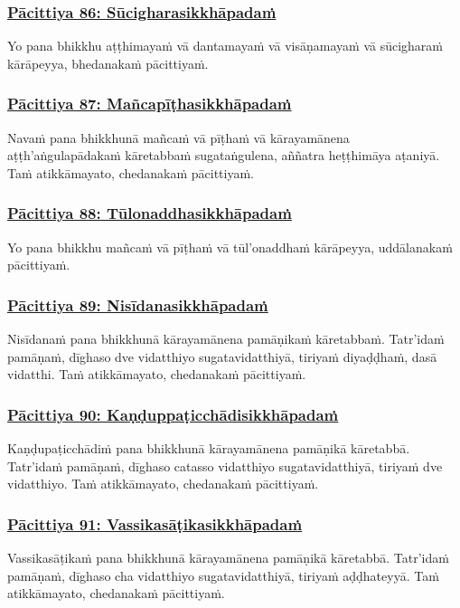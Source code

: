 \subsubsection*{\hyperref[exp86]{Pācittiya 86: Sūcigharasikkhāpadaṁ}}
\label{pac86}
Yo pana bhikkhu aṭṭhimayaṁ vā dantamayaṁ vā visāṇamayaṁ vā sūcigharaṁ kārāpeyya, bhedanakaṁ pācittiyaṁ.

\subsubsection*{\hyperref[exp87]{Pācittiya 87: Mañcapīṭhasikkhāpadaṁ}}
\label{pac87}
Navaṁ pana bhikkhunā mañcaṁ vā pīṭhaṁ vā kārayamānena aṭṭh'aṅgulapādakaṁ kāretabbaṁ sugataṅgulena, aññatra heṭṭhimāya aṭaniyā. Taṁ atikkāmayato, chedanakaṁ pācittiyaṁ.

\subsubsection*{\hyperref[exp88]{Pācittiya 88: Tūlonaddhasikkhāpadaṁ}}
\label{pac88}
Yo pana bhikkhu mañcaṁ vā pīṭhaṁ vā tūl'onaddhaṁ kārāpeyya, uddālanakaṁ pācittiyaṁ.

\subsubsection*{\hyperref[exp89]{Pācittiya 89: Nisīdanasikkhāpadaṁ}}
\label{pac89}
Nisīdanaṁ pana bhikkhunā kārayamānena pamāṇikaṁ kāretabbaṁ. Tatr'idaṁ pamāṇaṁ, dīghaso dve vidatthiyo sugatavidatthiyā, tiriyaṁ diyaḍḍhaṁ, dasā vidatthi. Taṁ atikkāmayato, chedanakaṁ pācittiyaṁ.

\subsubsection*{\hyperref[exp90]{Pācittiya 90: Kaṇḍuppaṭicchādisikkhāpadaṁ}}
\label{pac90}
Kaṇḍupaṭicchādiṁ pana bhikkhunā kārayamānena pamāṇikā kāretabbā. Tatr'idaṁ pamāṇaṁ, dīghaso catasso vidatthiyo sugatavidatthiyā, tiriyaṁ dve vidatthiyo. Taṁ atikkāmayato, chedanakaṁ pācittiyaṁ.

\subsubsection*{\hyperref[exp91]{Pācittiya 91: Vassikasāṭikasikkhāpadaṁ}}
\label{pac91}
Vassikasāṭikaṁ pana bhikkhunā kārayamānena pamāṇikā kāretabbā. Tatr'idaṁ pamāṇaṁ, dīghaso cha vidatthiyo sugatavidatthiyā, tiriyaṁ aḍḍhateyyā. Taṁ atikkāmayato, chedanakaṁ pācittiyaṁ.

